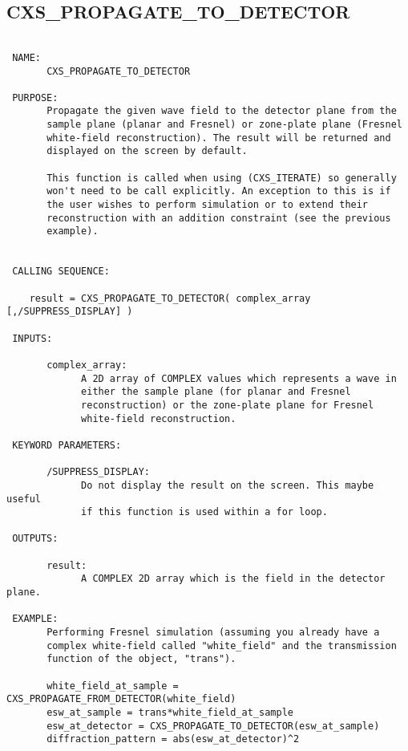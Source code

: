   
 
\subsection{CXS\_PROPAGATE\_TO\_DETECTOR}
\begin{verbatim}

 NAME:
       CXS_PROPAGATE_TO_DETECTOR

 PURPOSE:
       Propagate the given wave field to the detector plane from the 
       sample plane (planar and Fresnel) or zone-plate plane (Fresnel
       white-field reconstruction). The result will be returned and
       displayed on the screen by default.

       This function is called when using (CXS_ITERATE) so generally
       won't need to be call explicitly. An exception to this is if
       the user wishes to perform simulation or to extend their
       reconstruction with an addition constraint (see the previous
       example).


 CALLING SEQUENCE:

	result = CXS_PROPAGATE_TO_DETECTOR( complex_array [,/SUPPRESS_DISPLAY] )

 INPUTS:

       complex_array:
             A 2D array of COMPLEX values which represents a wave in
             either the sample plane (for planar and Fresnel
             reconstruction) or the zone-plate plane for Fresnel 
             white-field reconstruction.

 KEYWORD PARAMETERS:

       /SUPPRESS_DISPLAY:
             Do not display the result on the screen. This maybe useful
             if this function is used within a for loop. 

 OUTPUTS:

       result:
             A COMPLEX 2D array which is the field in the detector plane.

 EXAMPLE:
       Performing Fresnel simulation (assuming you already have a
       complex white-field called "white_field" and the transmission
       function of the object, "trans").

       white_field_at_sample = CXS_PROPAGATE_FROM_DETECTOR(white_field)
       esw_at_sample = trans*white_field_at_sample
       esw_at_detector = CXS_PROPAGATE_TO_DETECTOR(esw_at_sample)
       diffraction_pattern = abs(esw_at_detector)^2

\end{verbatim}






